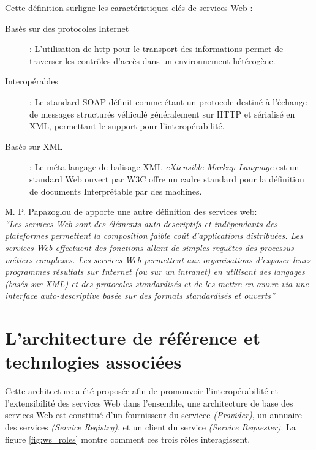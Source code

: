 Cette définition surligne les caractéristiques clés de services Web
\cite{fremantle2002enterprise}:

\renewcommand{\descriptionlabel}[1]{\hspace{1cm}\textbullet~\textsf{#1}}
\begin{description}
\item[Basés sur des protocoles Internet] : L'utilisation de
  \acrshort{http} pour le transport des informations permet de
  traverser les contrôles d'accès dans un environnement hétérogène.
  
\item[Interopérables] : Le standard \textsc{SOAP} \cite{box2000simple}
  définit comme étant un protocole destiné à l'échange de messages
  structurés véhiculé généralement sur \textsc{HTTP} et sérialisé en
  \textsc{XML}, permettant le support pour l'interopérabilité.
      
\item[Basés sur XML] : Le méta-langage de balisage \textsc{XML}
  \textit{eXtensible Markup Language} est un standard Web ouvert par
  \textsc{W3C} \cite{bray1998extensible} offre un cadre standard pour
  la définition de documents Interprétable par des machines.
\end{description}
    
M. P. Papazoglou \cite{papazoglou2003service} de apporte une
autre définition des services web:\\ \emph{``Les services Web sont
des éléments auto-descriptifs et indépendants des plateformes
permettent la composition faible coût d’applications
distribuées. Les services Web effectuent des fonctions allant de
simples requêtes des processus métiers complexes. Les services Web
permettent aux organisations d’exposer leurs programmes résultats
sur Internet (ou sur un intranet) en utilisant des langages (basés
sur XML) et des protocoles standardisés et de les mettre en œuvre
via une interface auto-descriptive basée sur des formats
standardisés et ouverts''}


%  

\section{L'architecture de référence et technlogies associées}
\label{sec:reference-arch}
Cette architecture a été proposée afin de promouvoir
l'interopérabilité et l'extensibilité des services Web dans
l'ensemble, une architecture de base des services Web est constitué
d'un fournisseur du servicee \textit{(Provider)}, un annuaire des
services \textit{(Service Registry)}, et un client du service
\textit{(Service Requester)}. La figure \ref{fig:ws_roles} montre
comment ces trois rôles interagissent.

